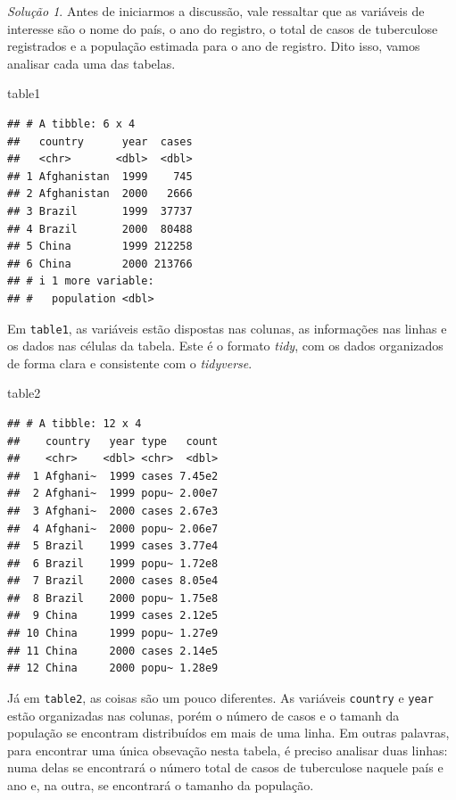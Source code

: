 \documentclass[
]{latex/krantz}
\newenvironment{Shaded}{\begin{snugshade}}{\end{snugshade}}
\newcommand{\NormalTok}[1]{#1}
\theoremstyle{definition}
\theoremstyle{definition}
\theoremstyle{definition}
\theoremstyle{definition}
\theoremstyle{remark}
\newtheorem*{solution}{Solução}
\begin{document}
\begin{solution}
Antes de iniciarmos a discussão, vale ressaltar que as variáveis de interesse são o nome do país, o ano do registro, o total de casos de tuberculose registrados e a população estimada para o ano de registro. Dito isso, vamos analisar cada uma das tabelas.

\begin{Shaded}
\begin{Highlighting}[]
\NormalTok{table1}
\end{Highlighting}
\end{Shaded}

\begin{verbatim}
## # A tibble: 6 x 4
##   country      year  cases
##   <chr>       <dbl>  <dbl>
## 1 Afghanistan  1999    745
## 2 Afghanistan  2000   2666
## 3 Brazil       1999  37737
## 4 Brazil       2000  80488
## 5 China        1999 212258
## 6 China        2000 213766
## # i 1 more variable:
## #   population <dbl>
\end{verbatim}

Em \texttt{table1}, as variáveis estão dispostas nas colunas, as informações nas linhas e os dados nas células da tabela. Este é o formato \emph{tidy}, com os dados organizados de forma clara e consistente com o \emph{tidyverse}.

\begin{Shaded}
\begin{Highlighting}[]
\NormalTok{table2}
\end{Highlighting}
\end{Shaded}

\begin{verbatim}
## # A tibble: 12 x 4
##    country   year type   count
##    <chr>    <dbl> <chr>  <dbl>
##  1 Afghani~  1999 cases 7.45e2
##  2 Afghani~  1999 popu~ 2.00e7
##  3 Afghani~  2000 cases 2.67e3
##  4 Afghani~  2000 popu~ 2.06e7
##  5 Brazil    1999 cases 3.77e4
##  6 Brazil    1999 popu~ 1.72e8
##  7 Brazil    2000 cases 8.05e4
##  8 Brazil    2000 popu~ 1.75e8
##  9 China     1999 cases 2.12e5
## 10 China     1999 popu~ 1.27e9
## 11 China     2000 cases 2.14e5
## 12 China     2000 popu~ 1.28e9
\end{verbatim}

Já em \texttt{table2}, as coisas são um pouco diferentes. As variáveis \texttt{country} e \texttt{year} estão organizadas nas colunas, porém o número de casos e o tamanh da população se encontram distribuídos em mais de uma linha. Em outras palavras, para encontrar uma única obsevação nesta tabela, é preciso analisar duas linhas: numa delas se encontrará o número total de casos de tuberculose naquele país e ano e, na outra, se encontrará o tamanho da população.


\end{solution}
\end{document}
